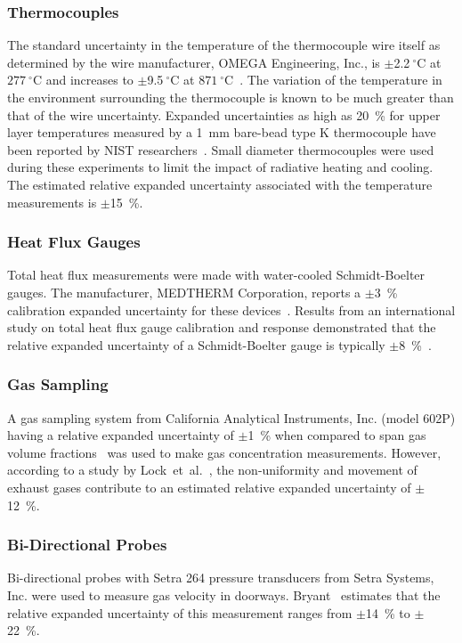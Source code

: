 \documentclass[12pt,oneside]{book}
\begin{document}
\subsubsection{Thermocouples}
The standard uncertainty in the temperature of the thermocouple wire itself as determined by the wire manufacturer, OMEGA Engineering, Inc., is $\pm$2.2$~^{\circ}$C at $277~^{\circ}$C and increases to $\pm$9.5$~^{\circ}$C at $871~^{\circ}$C~\cite{Omega:2004}. The variation of the temperature in the environment surrounding the thermocouple is known to be much greater than that of the wire uncertainty. Expanded uncertainties as high as 20~\% for upper layer temperatures measured by a 1~mm bare-bead type K thermocouple have been reported by NIST researchers~\cite{Blevins:1999,Pitts:2003}. Small diameter thermocouples were used during these experiments to limit the impact of radiative heating and cooling. The estimated relative expanded uncertainty associated with the temperature measurements is $\pm$15~\%.

\subsubsection{Heat Flux Gauges}
Total heat flux measurements were made with water-cooled Schmidt-Boelter gauges. The manufacturer, MEDTHERM Corporation, reports a $\pm$3~\% calibration expanded uncertainty for these devices~\cite{Medtherm:2003}. Results from an international study on total heat flux gauge calibration and response demonstrated that the relative expanded uncertainty of a Schmidt-Boelter gauge is typically $\pm$8~\%~\cite{Pitts:2006}.

\subsubsection{Gas Sampling}
A gas sampling system from California Analytical Instruments, Inc. (model 602P) having a relative expanded uncertainty of $\pm$1~\% when compared to span gas volume fractions~\cite{Bundy:2007} was used to make gas concentration measurements. However, according to a study by Lock~et~al.~\cite{Lock:1}, the non-uniformity and movement of exhaust gases contribute to an estimated relative expanded uncertainty of $\pm$12~\%.

\subsubsection{Bi-Directional Probes}
Bi-directional probes with Setra 264 pressure transducers from Setra Systems, Inc. were used to measure gas velocity in doorways. Bryant~\cite{Bryant:FSJ2009} estimates that the relative expanded uncertainty of this measurement ranges from $\pm$14~\% to $\pm$22~\%.
\end{document}
